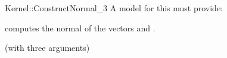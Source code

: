 \begin{ccRefFunctionObjectConcept}{Kernel::ConstructNormal_3}
A model for this must provide:


 {computes the normal of the vectors and .}

\ccRefines
{} (with three arguments)

\ccSeeAlso
{} \\
 \\

\end{ccRefFunctionObjectConcept}
